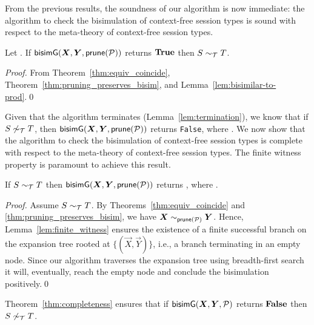 From the previous results, the soundness of our algorithm is now
immediate: the algorithm to check the bisimulation of context-free
session types is sound with respect to
the meta-theory of context-free session types.

\begin{theorem}[Soundness]
  \label{thm:soundness}
  Let \grmcontext.  If $\Bisim(\vec X,\vec Y, \Prune(\productions))$ returns $\mathbf{True}$ then
  $S\sim_\mathcal T T$.
\end{theorem}
%
\begin{proof}
  From Theorem~\ref{thm:equiv_coincide}, Theorem~\ref{thm:pruning_preserves_bisim}, 
  and Lemma~\ref{lem:bisimilar-to-prod}.\qed
\end{proof}

 
Given that the algorithm terminates (Lemma~\ref{lem:termination}), we
know that if $S\not\sim_\mathcal T T$, then $\Bisim(\vec X, \vec Y, 
\Prune(\productions))$ returns
\lstinline|False|, where \grmcontext.
%
We now show that the algorithm to check the bisimulation of
context-free session types is complete with respect to the meta-theory
of context-free session types. The finite witness property is
paramount to achieve this result.

\begin{theorem}[Completeness]
\label{thm:completeness}
  If $S \sim_\mathcal T T$ then $\Bisim(\vec X, \vec Y, \Prune(\productions))$ 
  returns
  , where \grmcontext.
\end{theorem}
%
\begin{proof}
  Assume $S \sim_\mathcal T T$. By Theorems~\ref{thm:equiv_coincide}
  and \ref{thm:pruning_preserves_bisim},
  we have $\vec X \sim_{\Prune(\productions)} \vec Y$.  Hence,
  Lemma~\ref{lem:finite_witness} ensures the existence of a finite
  successful branch on the expansion tree rooted at
  $\{(\vec X,\vec Y)\}$, i.e., a branch terminating in an empty
  node.  Since our algorithm traverses the expansion tree using
  breadth-first search it will, eventually, reach the empty node and
  conclude the bisimulation positively.\qed
\end{proof}

Theorem~\ref{thm:completeness} ensures that if
$\Bisim(\vec X,\vec Y, \productions)$ returns $\mathbf{False}$ then
$S \not\sim_\mathcal T T$.


